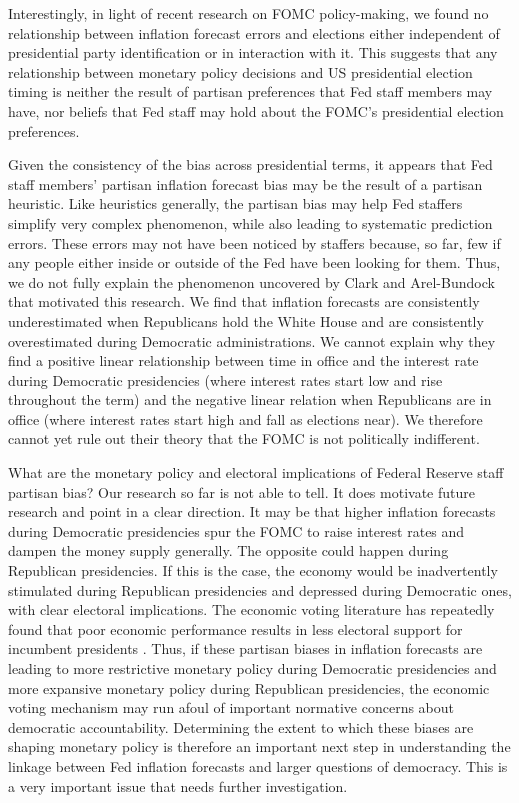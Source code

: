 \documentclass[a4paper]{article}\usepackage{graphicx, color}
\begin{document}
Interestingly, in light of recent research on FOMC policy-making, we found no relationship between inflation forecast errors and elections either independent of presidential party identification or in interaction with it. This suggests that any relationship between monetary policy decisions and US presidential election timing is neither the result of partisan preferences that Fed staff members may have, nor beliefs that Fed staff may hold about the FOMC's presidential election preferences. 

Given the consistency of the bias across presidential terms, it appears that Fed staff members' partisan inflation forecast bias may be the result of a partisan heuristic. Like heuristics generally, the partisan bias may help Fed staffers simplify very complex phenomenon, while also leading to systematic prediction errors. These errors may not have been noticed by staffers because, so far, few if any people either inside or outside of the Fed have been looking for them. Thus, we do not fully explain the phenomenon uncovered by Clark and Arel-Bundock that motivated this research. We find that inflation forecasts are consistently underestimated when Republicans hold the White House and are consistently overestimated during Democratic administrations. We cannot explain why they find a positive linear relationship between time in office and the interest rate during Democratic presidencies (where interest rates start low and rise throughout the term) and the negative linear relation when Republicans are in office (where interest rates start high and fall as elections near). We therefore cannot yet rule out their theory that the FOMC is not politically indifferent.

What are the monetary policy and electoral implications of Federal Reserve staff partisan bias? Our research so far is not able to tell. It does motivate future research and point in a clear direction. It may be that higher inflation forecasts during Democratic presidencies spur the FOMC to raise interest rates and dampen the money supply generally. The opposite could happen during Republican presidencies. If this is the case, the economy would be inadvertently stimulated during Republican presidencies and depressed during Democratic ones, with clear electoral implications. The economic voting literature has repeatedly found that poor economic performance results in less electoral support for incumbent presidents \citep[e.g.][]{Alvarez1998, Bloom1975, LewisBeck1988, Powell1993}. Thus, if these partisan biases in inflation forecasts are leading to more restrictive monetary policy during Democratic presidencies and more expansive monetary policy during Republican presidencies, the economic voting mechanism may run afoul of important normative concerns about democratic accountability. Determining the extent to which these biases are shaping monetary policy is therefore an important next step in understanding the linkage between Fed inflation forecasts and larger questions of democracy. This is a very important issue that needs further investigation.
\end{document}
